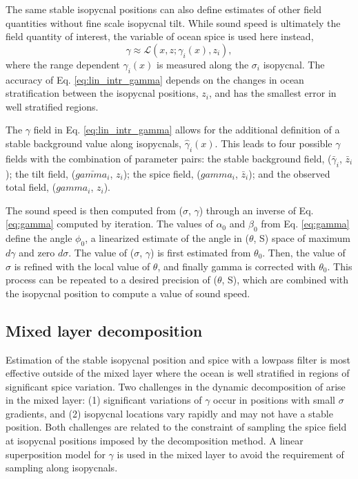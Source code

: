 \documentclass[preprint,NumberedRefs]{JASA}
\begin{document}
The same stable isopycnal positions can also define estimates of other field quantities without fine scale isopycnal tilt. While sound speed is ultimately the field quantity of interest, the variable of ocean spice is used here instead,
\begin{equation}
    \gamma\approx\mathcal{L}(x, z; \gamma_i(x), z_i),
    \label{eq:lin_intr_gamma}
\end{equation}
where the range dependent $\gamma_i(x)$ is measured along the $\sigma_i$ isopycnal. The accuracy of Eq. \eqref{eq:lin_intr_gamma} depends on the changes in ocean stratification between the isopycnal positions, $z_i$, and has the smallest error in well stratified regions.

The $\gamma$ field in Eq. \eqref{eq:lin_intr_gamma} allows for the additional definition of a stable background value along isopycnals, $\hat{\gamma}_i(x)$. This leads to four possible $\gamma$ fields with the combination of parameter pairs: the stable background field, ($\bar{\gamma}_i$, $\bar{z}_i$); the tilt field, ($\bar{gamma_i}$, $z_i$); the spice field, ($gamma_i$, $\bar{z}_i$); and the observed total field, ($gamma_i$, $z_i$).

The sound speed is then computed from ($\sigma$, $\gamma$) through an inverse of Eq. \eqref{eq:gamma} computed by iteration. The values of $\alpha_0$ and $\beta_0$ from Eq. \eqref{eq:gamma} define the angle $\phi_0$, a linearized estimate of the angle in ($\theta$, S) space of maximum $d\gamma$ and zero $d\sigma$. The value of ($\sigma$, $\gamma$) is first estimated from $\theta_0$. Then, the value of $\sigma$ is refined with the local value of $\theta$, and finally gamma is corrected with $\theta_0$. This process can be repeated to a desired precision of ($\theta$, S), which are combined with the isopycnal position to compute a value of sound speed.

\subsection{Mixed layer decomposition}
Estimation of the stable isopycnal position and spice with a lowpass filter is most effective outside of the mixed layer where the ocean is well stratified in regions of significant spice variation. Two challenges in the dynamic decomposition of \citep{dzieciuch2004} arise in the mixed layer: (1) significant variations of $\gamma$ occur in positions with small $\sigma$ gradients, and (2) isopycnal locations vary rapidly and may not have a stable position. Both challenges are related to the constraint of sampling the spice field at isopycnal positions imposed by the decomposition method. A linear superposition model for $\gamma$ is used in the mixed layer to avoid the requirement of sampling along isopycnals.
\end{document}
